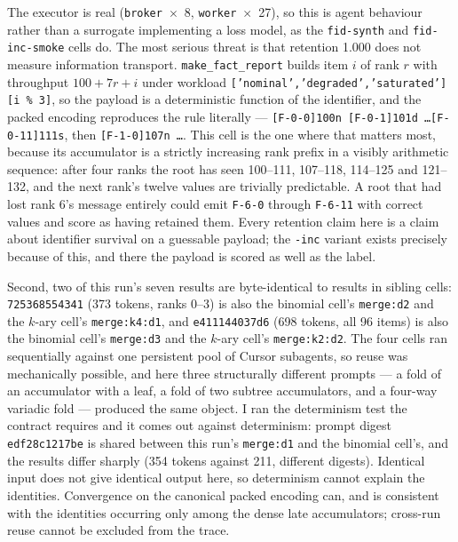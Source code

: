 \documentclass[11pt]{article}
\begin{document}
The executor is real (\texttt{broker}~$\times$~8, \texttt{worker}~$\times$~27), so this is
agent behaviour rather than a surrogate implementing a loss model, as the
\texttt{fid-synth} and \texttt{fid-inc-smoke} cells do. The most serious threat is that
retention 1.000 does not measure information transport. \texttt{make\_fact\_report} builds
item $i$ of rank $r$ with throughput $100 + 7r + i$ under workload
\texttt{['nominal','degraded','saturated'][i \% 3]}, so the payload is a deterministic
function of the identifier, and the packed encoding reproduces the rule literally ---
\texttt{[F-0-0]100n [F-0-1]101d \dots [F-0-11]111s}, then \texttt{[F-1-0]107n \dots}. This
cell is the one where that matters most, because its accumulator is a strictly increasing
rank prefix in a visibly arithmetic sequence: after four ranks the root has seen 100--111,
107--118, 114--125 and 121--132, and the next rank's twelve values are trivially
predictable. A root that had lost rank 6's message entirely could emit \texttt{F-6-0}
through \texttt{F-6-11} with correct values and score as having retained them. Every
retention claim here is a claim about identifier survival on a guessable payload; the
\texttt{-inc} variant exists precisely because of this, and there the payload is scored as
well as the label.

Second, two of this run's seven results are byte-identical to results in sibling cells:
\texttt{725368554341} (373 tokens, ranks 0--3) is also the binomial cell's
\texttt{merge:d2} and the $k$-ary cell's \texttt{merge:k4:d1}, and \texttt{e411144037d6}
(698 tokens, all 96 items) is also the binomial cell's \texttt{merge:d3} and the $k$-ary
cell's \texttt{merge:k2:d2}. The four cells ran sequentially against one persistent pool of
Cursor subagents, so reuse was mechanically possible, and here three structurally different
prompts --- a fold of an accumulator with a leaf, a fold of two subtree accumulators, and a
four-way variadic fold --- produced the same object. I ran the determinism test the contract
requires and it comes out against determinism: prompt digest \texttt{edf28c1217be} is shared
between this run's \texttt{merge:d1} and the binomial cell's, and the results differ sharply
(354 tokens against 211, different digests). Identical input does not give identical output
here, so determinism cannot explain the identities. Convergence on the canonical packed
encoding can, and is consistent with the identities occurring only among the dense late
accumulators; cross-run reuse cannot be excluded from the trace.
\end{document}
